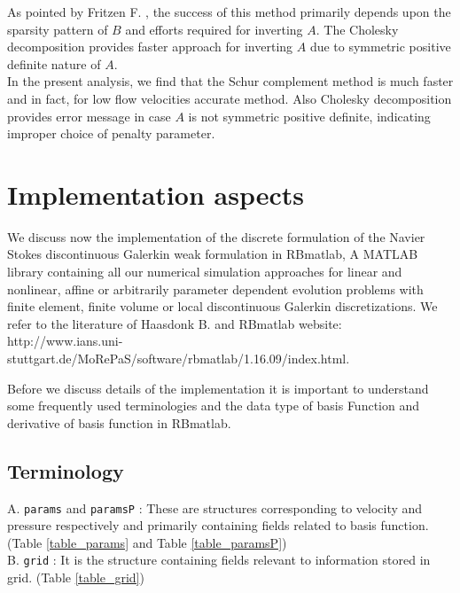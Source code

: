 \documentclass[a4paper,openany]{book}
\begin{document}
As pointed by Fritzen F. \cite{Fritzen}, the success of this method primarily depends upon the sparsity pattern of $B$ and efforts required for inverting $A$. The Cholesky decomposition provides faster approach for inverting $A$ due to symmetric positive definite nature of $A$. \\

In the present analysis, we find that the Schur complement method is much faster and in fact, for low flow velocities accurate method. Also Cholesky decomposition provides error message in case $A$ is not symmetric positive definite, indicating improper choice of penalty parameter. 

\chapter{Implementation aspects} \label{implementation_aspects}

We discuss now the implementation of the discrete formulation of the Navier Stokes discontinuous Galerkin weak formulation in RBmatlab, A MATLAB library containing all our numerical simulation approaches for linear and nonlinear, affine or arbitrarily parameter dependent evolution problems with finite element, finite volume or local discontinuous Galerkin discretizations. We refer to the literature of Haasdonk B.\cite{Haasdonk_book} and RBmatlab website: \\
http://www.ians.uni-stuttgart.de/MoRePaS/software/rbmatlab/1.16.09/\linebreak index.html.  

Before we discuss details of the implementation it is important to understand some frequently used terminologies and the data type of basis Function and derivative of basis function in RBmatlab.

\section{Terminology}

A. \verb|params| and \verb|paramsP| : These are structures corresponding to velocity and pressure respectively and primarily containing fields related to basis function. (Table \ref{table_params} and Table \ref{table_paramsP})\\

B. \verb|grid| : It is the structure containing fields relevant to information stored in grid. (Table \ref{table_grid})\\
\end{document}
